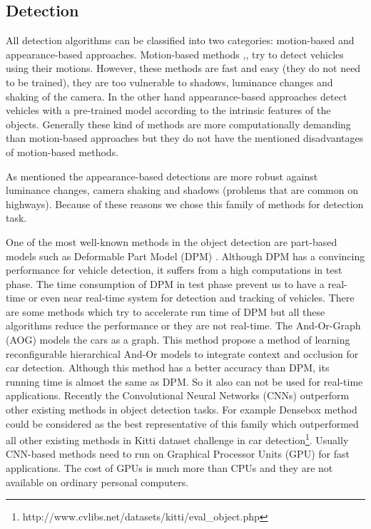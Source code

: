 \documentclass[conference]{IEEEtran}
\begin{document}
\subsection{Detection}
All detection algorithms can be classified into two categories: motion-based and appearance-based approaches. Motion-based methods \cite{sen2004robust},\cite{sirikuntamat2015vehicle},\cite{lu2014moving} try to detect vehicles using their motions. However, these methods are fast and easy (they do not need to be trained), they are too vulnerable to shadows, luminance changes and shaking of the camera. In the other hand appearance-based approaches detect vehicles with a pre-trained model according to the intrinsic features of the objects. Generally these kind of methods are more  computationally demanding than motion-based approaches but they do not have the mentioned disadvantages of motion-based methods.

As mentioned the appearance-based detections are more robust against luminance changes, camera shaking and shadows (problems that are common on highways). Because of these reasons we chose this family of methods for detection task. 

One of the most well-known methods in the object detection are part-based models such as Deformable Part Model (DPM) \cite{felzenszwalb2008discriminatively}. Although DPM has a convincing performance for vehicle detection, it suffers from a high computations in test phase. The time consumption of DPM in test phase prevent us to have a real-time or even near real-time system for detection and tracking of vehicles. There are some methods which try to accelerate run time of DPM \cite{} but all these algorithms reduce the performance or they are not real-time.
The And-Or-Graph (AOG) \cite{li2014integrating} models the cars as a graph. This method propose a method of learning reconfigurable hierarchical
And-Or models to integrate context and occlusion for car detection. Although this method has a better accuracy than DPM, its running time is  almost the same as DPM. So it also can not be used for real-time applications. Recently the Convolutional Neural Networks (CNNs) outperform other existing methods in object detection tasks. For example Densebox method \cite{huang2015densebox} could be considered as the best representative of this family which outperformed all other existing methods in Kitti dataset challenge in car detection\footnote{http://www.cvlibs.net/datasets/kitti/eval\_object.php}. Usually CNN-based methods need to run on Graphical Processor Units (GPU) for fast applications. The cost of GPUs is much more than CPUs and they are not available on ordinary personal computers.
\end{document}
